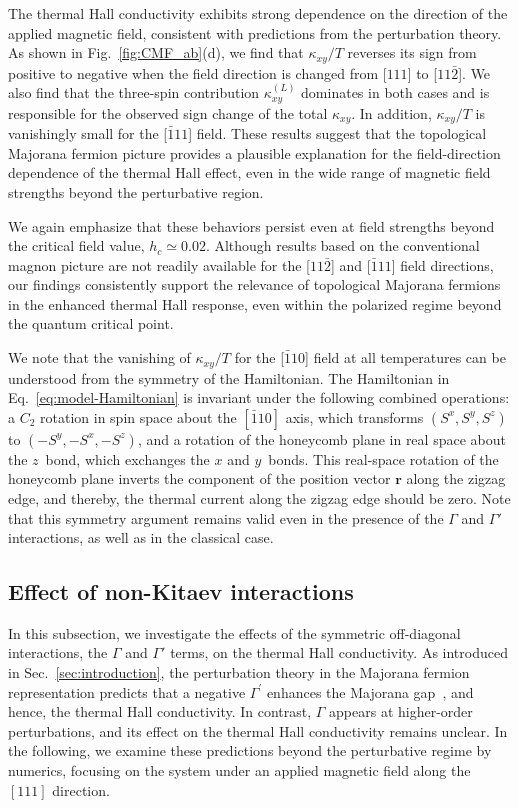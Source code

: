 \documentclass[twocolumn,superscriptaddress,showpacs, longbibliography, aps, prx]{revtex4-2}
\begin{document}
The thermal Hall conductivity exhibits strong dependence on the direction of the applied magnetic field, consistent with predictions from the perturbation theory.
As shown in Fig.~\ref{fig:CMF_ab}(d), we find that $\kappa_{xy}/T$ reverses its sign from positive to negative when the field direction is changed from [$111$] to  [$11\bar{2}$]. 
We also find that the three-spin contribution $\kappa_{xy}^{(L)}$ dominates in both cases and is responsible for the observed sign change of the total $\kappa_{xy}$.
In addition, $\kappa_{xy}/T$ is vanishingly small for the [$\bar{1}11$] field. 
These results suggest that the topological Majorana fermion picture provides a plausible explanation for the field-direction dependence of the thermal Hall effect, even in the wide range of magnetic field strengths beyond the perturbative region. 

We again emphasize that these behaviors persist even at field strengths beyond the critical field value, $h_c \simeq 0.02$. 
Although results based on the conventional magnon picture are not readily available for the [$11\bar{2}$] and [$\bar{1}11$] field directions, our findings consistently support the relevance of topological Majorana fermions in the enhanced thermal Hall response, even within the polarized regime beyond the quantum critical point. 

We note that the vanishing of $\kappa_{xy}/T$ for the [$\bar{1}10$] field at all temperatures can be understood from the symmetry of the Hamiltonian.
The Hamiltonian in Eq.~\eqref{eq:model-Hamiltonian} is invariant under the following combined operations: 
a $C_2$ rotation in spin space about the $[\bar{1}10]$ axis, which transforms $(S^x,S^y,S^z)$ to $(-S^y,-S^x,-S^z)$, and a rotation of the honeycomb plane in real space about the $z$~bond, which exchanges the $x$ and $y$~bonds.
This real-space rotation of the honeycomb plane inverts the component of the position vector $\bm{r}$ along the zigzag edge, and thereby, the thermal current along the zigzag edge should be zero.
Note that this symmetry argument remains valid even in the presence of the $\Gamma$ and $\Gamma'$ interactions, as well as in the classical case.


\subsection{Effect of non-Kitaev interactions}
\label{sec:Gamma}
In this subsection, we investigate the effects of the symmetric off-diagonal interactions, the $\Gamma$ and $\Gamma'$ terms, on the thermal Hall conductivity.
As introduced in Sec.~\ref{sec:introduction}, the perturbation theory in the Majorana fermion representation predicts that a negative $\Gamma^{\prime}$ enhances the Majorana gap~\cite{TakikawaF2020}, and hence, the thermal Hall conductivity. 
In contrast, $\Gamma$ appears at higher-order perturbations, and its effect on the thermal Hall conductivity remains unclear.
In the following, we examine these predictions beyond the perturbative regime by numerics, focusing on the system under an applied magnetic field along the $[111]$ direction.
\end{document}
